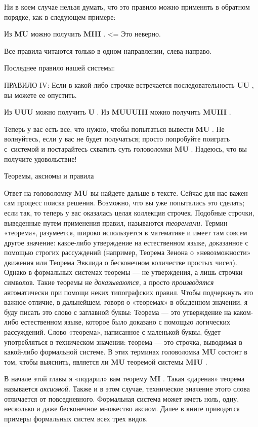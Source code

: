 Ни в коем случае нельзя думать, что это правило можно применять в обратном порядке, как в следующем примере:

Из \textbf{MU} можно получить \textbf{MIII} . \textless= Это неверно.

Все правила читаются только в одном направлении, слева направо.

Последнее правило нашей системы:

ПРАВИЛО IV: Если в какой-либо строчке встречается последовательность \textbf{UU} , вы можете ее опустить.

Из \textbf{UUU} можно получить \textbf{U} . Из \textbf{MUUUIII} можно получить \textbf{MUIII} .

Теперь у вас есть все, что нужно, чтобы попытаться вывести \textbf{MU} . Не волнуйтесь, если у вас не будет получаться; просто попробуйте поиграть с~системой и постарайтесь схватить суть головоломки \textbf{MU} . Надеюсь, что вы получите удовольствие!

Теоремы, аксиомы и правила

Ответ на головоломку \textbf{MU} вы найдете дальше в тексте. Сейчас для нас важен сам процесс поиска решения. Возможно, что вы уже попытались это сделать; если так, то теперь у вас оказалась целая коллекция строчек. Подобные строчки, выведенные путем применения правил, называются \emph{теоремами.} Термин «теорема», разумеется, широко используется в математике и имеет там совсем другое значение: какое-либо утверждение на естественном языке, доказанное с помощью строгих рассуждений (например, Теорема Зенона о «невозможности» движения или Теорема Эвклида о бесконечном количестве простых чисел). Однако в формальных системах теоремы --- не утверждения, а лишь строчки символов. Такие теоремы не \emph{доказываются,} а просто \emph{производятся} автоматически при помощи неких типографских правил. Чтобы подчеркнуть это важное отличие, в дальнейшем, говоря о «теоремах» в обыденном значении, я буду писать это слово с заглавной буквы: Теорема --- это утверждение на каком-либо естественном языке, которое было доказано с помощью логических рассуждений. Слово «теорема», написанное с маленькой буквы, будет употребляться в техническом значении: теорема --- это строчка, выводимая в какой-либо формальной системе. В этих терминах головоломка \textbf{MU} состоит в том, чтобы выяснить, является ли \textbf{MU} теоремой системы \textbf{MIU} .

В начале этой главы я «подарил» вам теорему \textbf{MI} . Такая «дареная» теорема называется \emph{аксиомой.} Также и в этом случае, техническое значение этого слова отличается от повседневного. Формальная система может иметь ноль, одну, несколько и даже бесконечное множество аксиом. Далее в книге приводятся примеры формальных систем всех трех видов.

